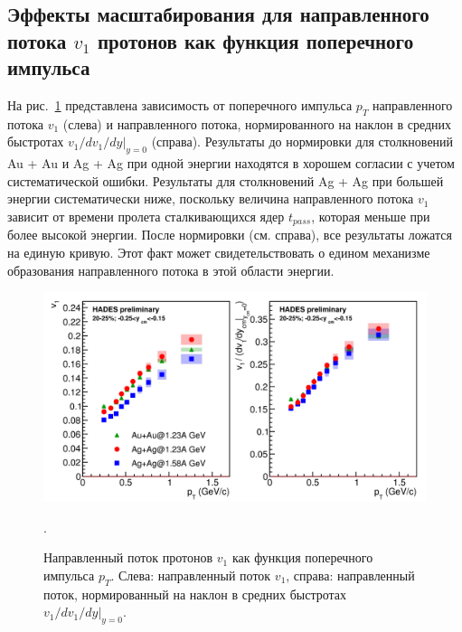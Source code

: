\subsection{Эффекты масштабирования для направленного потока $v_1$ протонов как функция поперечного импульса}

На рис.~\ref{fig:v1_pT_scaling} представлена зависимость от поперечного импульса $p_T$ направленного потока $v_1$ (слева) и направленного потока, нормированного на наклон в средних быстротах $v_1/dv_1/dy|_{y=0}$ (справа).
Результаты до нормировки для столкновений Au + Au и Ag + Ag при одной энергии находятся в хорошем согласии с учетом систематической ошибки.
Результаты для столкновений Ag + Ag при большей энергии систематически ниже, поскольку величина направленного потока $v_1$ зависит от времени пролета сталкивающихся ядер $t_{pass}$, которая меньше при более высокой энергии.
После нормировки (см. справа), все результаты ложатся на единую кривую.
Этот факт может свидетельствовать о едином механизме образования направленного потока в этой области энергии.
\begin{figure}[ht]
\begin{center}
\includegraphics[width=0.9\linewidth]{images/v1_hades_pT_scaling.png}
\caption{ 
    Направленный поток протонов $v_1$ как функция поперечного импульса $p_T$. Слева: направленный поток $v_1$, справа: направленный поток, нормированный на наклон в средних быстротах $v_1/dv_1/dy|_{y=0}$.
}.
\label{fig:v1_pT_scaling}
\end{center}
\end{figure}

